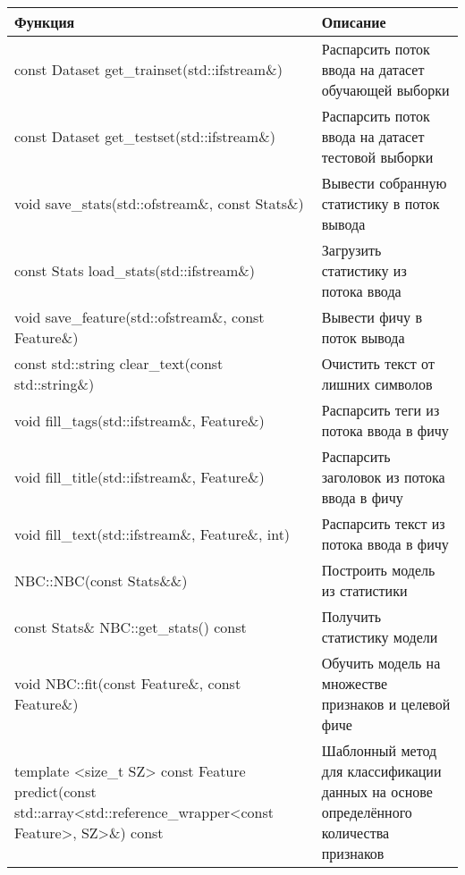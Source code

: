 \begin{tabular}{|m{}|m{}|}
    \hline
    Функция & Описание \\
    \hline\hline
    const Dataset get\_trainset(std::ifstream\&) & Распарсить поток ввода на датасет обучающей выборки \\
    \hline
    const Dataset get\_testset(std::ifstream\&) & Распарсить поток ввода на датасет тестовой выборки \\
    \hline
    void save\_stats(std::ofstream\&, const Stats\&) & Вывести собранную статистику в поток вывода \\
    \hline
    const Stats load\_stats(std::ifstream\&) & Загрузить статистику из потока ввода \\
    \hline
    void save\_feature(std::ofstream\&, const Feature\&) & Вывести фичу в поток вывода \\
    \hline
    const std::string clear\_text(const std::string\&) & Очистить текст от лишних символов \\
    \hline
    void fill\_tags(std::ifstream\&, Feature\&) & Распарсить теги из потока ввода в фичу \\
    \hline
    void fill\_title(std::ifstream\&, Feature\&) & Распарсить заголовок из потока ввода в фичу \\
    \hline
    void fill\_text(std::ifstream\&, Feature\&, int) & Распарсить текст из потока ввода в фичу \\
    \hline
    NBC::NBC(const Stats\&\&) & Построить модель из статистики \\
    \hline
    const Stats\& NBC::get\_stats() const & Получить статистику модели \\
    \hline
    void NBC::fit(const Feature\&, const Feature\&) & Обучить модель на множестве признаков и целевой фиче \\
    \hline
    template <size\_t SZ> const Feature predict(const std::array<std::reference\_wrapper<const Feature>, SZ>\&) const & Шаблонный метод для классификации данных на основе определённого количества признаков \\
    \hline
\end{tabular}

\restoregeometry
\pagebreak

